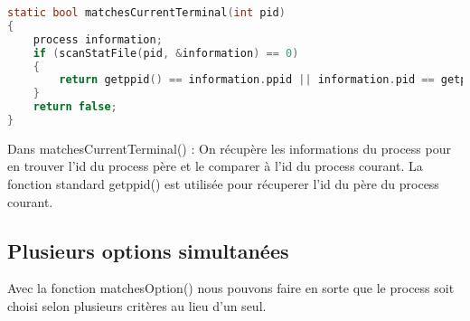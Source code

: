 \begin{lstlisting}[frame=single, language=c]
static bool matchesCurrentTerminal(int pid)
{
    process information;
    if (scanStatFile(pid, &information) == 0)
    {
        return getppid() == information.ppid || information.pid == getppid();
    }
    return false;
}
\end{lstlisting}

Dans matchesCurrentTerminal() : On récupère les informations du process pour en trouver l'id du process père et le comparer à l'id du process courant. La fonction standard getppid() est utilisée pour récuperer l'id du père du process courant.

\subsection{Plusieurs options simultanées} 

Avec la fonction matchesOption() nous pouvons faire en sorte que le process soit choisi selon plusieurs critères au lieu d'un seul. 